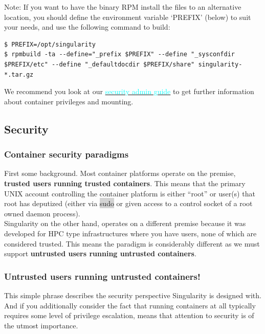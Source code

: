 \documentclass[a4paper]{article}
\begin{document}
Note: If you want to have the binary RPM install the files to an alternative location, you should define the environment variable ‘PREFIX’ (below) to suit your needs, and use the following command to build:

\begin{lstlisting}[frame=single]
$ PREFIX=/opt/singularity
$ rpmbuild -ta --define="_prefix $PREFIX" --define "_sysconfdir $PREFIX/etc" --define "_defaultdocdir $PREFIX/share" singularity-*.tar.gz
\end{lstlisting}

We recommend you look at our \hyperref[sec:security]{{\textcolor{cyan}{security admin guide}}} to get further information about container privileges and mounting.

\subsection{Security}
\label{sec:security}
\subsubsection{Container security paradigms}

First some background. Most container platforms operate on the premise, \textbf{trusted users running trusted containers}. This means that the primary UNIX account controlling the container platform is either “root” or user(s) that root has deputized (either via \colorbox{lightgray}{sudo} or given access to a control socket of a root owned daemon process).\\[0.1in]

Singularity on the other hand, operates on a different premise because it was developed for HPC type infrastructures where you have users, none of which are considered trusted. This means the paradigm is considerably different as we must support \textbf{untrusted users running untrusted containers}.

\subsubsection{Untrusted users running untrusted containers!}

This simple phrase describes the security perspective Singularity is designed with. And if you additionally consider the fact that running containers at all typically requires some level of privilege escalation, means that attention to security is of the utmost importance.\\[0.1in]
\end{document}
